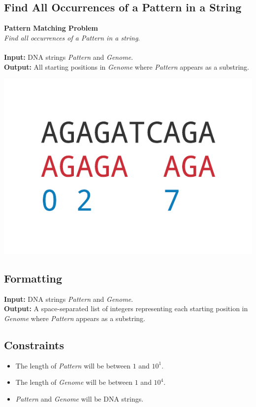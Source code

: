 \documentclass{article}
\begin{document}
\subsection{Find All Occurrences of a Pattern in a String}
\hline\vspace{5}
\noindent \textbf{Pattern Matching Problem}\\
\emph{Find all occurrences of a Pattern in a string}.\\ \\
\textbf{Input:} DNA strings \emph{Pattern} and \emph{Genome}.\\
\textbf{Output:} All starting positions in \emph{Genome} where \emph{Pattern} appears as a substring.
\begin{center}
    \includegraphics[scale=0.2]{c1/logos/1D.png} 
\end{center}
\hline\vspace{5}

\subsection*{Formatting}
\textbf{Input:} DNA strings \emph{Pattern} and \emph{Genome}.\\
\noindent \textbf{Output:} A space-separated list of integers representing each starting position in \emph{Genome} where \emph{Pattern} appears as a substring.

\subsection*{Constraints}
\begin{itemize}
    \item The length of \emph{Pattern} will be between $1$ and $10^1$.
    \item The length of \emph{Genome} will be between $1$ and $10^4$.
    \item \emph{Pattern} and \emph{Genome} will be DNA strings.
\end{itemize}
\pagebreak
\end{document}
